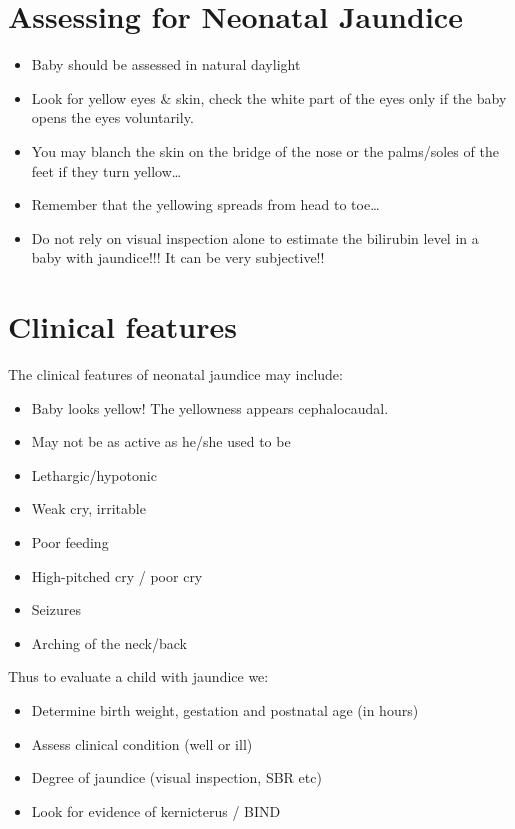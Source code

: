 \documentclass[
  letterpaper,
  DIV=11,
  numbers=noendperiod]{scrreprt}
\providecommand{\tightlist}{%
  \setlength{\itemsep}{0pt}\setlength{\parskip}{0pt}}\usepackage{longtable,booktabs,array}
\begin{document}
\hypertarget{assessing-for-neonatal-jaundice}{%
\section{Assessing for Neonatal
Jaundice}\label{assessing-for-neonatal-jaundice}}

\begin{itemize}
\tightlist
\item
  Baby should be assessed in natural daylight
\item
  Look for yellow eyes \& skin, check the white part of the eyes only if
  the baby opens the eyes voluntarily.
\item
  You may blanch the skin on the bridge of the nose or the palms/soles
  of the feet if they turn yellow\ldots{}
\item
  Remember that the yellowing spreads from head to toe\ldots{}
\item
  Do not rely on visual inspection alone to estimate the bilirubin level
  in a baby with jaundice!!! It can be very subjective!!
\end{itemize}

\hypertarget{clinical-features}{%
\section{Clinical features}\label{clinical-features}}

The clinical features of neonatal jaundice may include:

\begin{itemize}
\tightlist
\item
  Baby looks yellow! The yellowness appears cephalocaudal.
\item
  May not be as active as he/she used to be
\item
  Lethargic/hypotonic
\item
  Weak cry, irritable
\item
  Poor feeding
\item
  High-pitched cry / poor cry
\item
  Seizures
\item
  Arching of the neck/back
\end{itemize}

Thus to evaluate a child with jaundice we:

\begin{itemize}
\tightlist
\item
  Determine birth weight, gestation and postnatal age (in hours)
\item
  Assess clinical condition (well or ill)
\item
  Degree of jaundice (visual inspection, SBR etc)
\item
  Look for evidence of kernicterus / BIND
\end{itemize}
\end{document}
